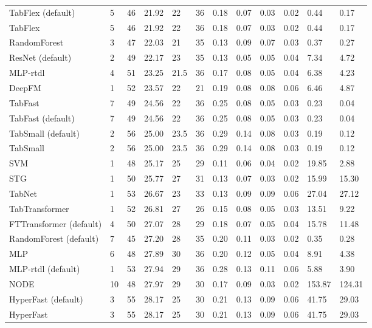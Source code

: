 \begin{tabular}{lllllrllllll}
TabFlex (default) & 5 & 46 & 21.92 & 22 & 36 & 0.18 & 0.07 & 0.03 & 0.02 & 0.44 & 0.17 \\
TabFlex & 5 & 46 & 21.92 & 22 & 36 & 0.18 & 0.07 & 0.03 & 0.02 & 0.44 & 0.17 \\
RandomForest & 3 & 47 & 22.03 & 21 & 35 & 0.13 & 0.09 & 0.07 & 0.03 & 0.37 & 0.27 \\
ResNet (default) & 2 & 49 & 22.17 & 23 & 35 & 0.13 & 0.05 & 0.05 & 0.04 & 7.34 & 4.72 \\
MLP-rtdl & 4 & 51 & 23.25 & 21.5 & 36 & 0.17 & 0.08 & 0.05 & 0.04 & 6.38 & 4.23 \\
DeepFM & 1 & 52 & 23.57 & 22 & 21 & 0.19 & 0.08 & 0.08 & 0.06 & 6.46 & 4.87 \\
TabFast & 7 & 49 & 24.56 & 22 & 36 & 0.25 & 0.08 & 0.05 & 0.03 & 0.23 & 0.04 \\
TabFast (default) & 7 & 49 & 24.56 & 22 & 36 & 0.25 & 0.08 & 0.05 & 0.03 & 0.23 & 0.04 \\
TabSmall (default) & 2 & 56 & 25.00 & 23.5 & 36 & 0.29 & 0.14 & 0.08 & 0.03 & 0.19 & 0.12 \\
TabSmall & 2 & 56 & 25.00 & 23.5 & 36 & 0.29 & 0.14 & 0.08 & 0.03 & 0.19 & 0.12 \\
SVM & 1 & 48 & 25.17 & 25 & 29 & 0.11 & 0.06 & 0.04 & 0.02 & 19.85 & 2.88 \\
STG & 1 & 50 & 25.77 & 27 & 31 & 0.13 & 0.07 & 0.03 & 0.02 & 15.99 & 15.30 \\
TabNet & 1 & 53 & 26.67 & 23 & 33 & 0.13 & 0.09 & 0.09 & 0.06 & 27.04 & 27.12 \\
TabTransformer & 1 & 52 & 26.81 & 27 & 26 & 0.15 & 0.08 & 0.05 & 0.03 & 13.51 & 9.22 \\
FTTransformer (default) & 4 & 50 & 27.07 & 28 & 29 & 0.18 & 0.07 & 0.05 & 0.04 & 15.78 & 11.48 \\
RandomForest (default) & 7 & 45 & 27.20 & 28 & 35 & 0.20 & 0.11 & 0.03 & 0.02 & 0.35 & 0.28 \\
MLP & 6 & 48 & 27.89 & 30 & 36 & 0.20 & 0.12 & 0.05 & 0.04 & 8.91 & 4.38 \\
MLP-rtdl (default) & 1 & 53 & 27.94 & 29 & 36 & 0.28 & 0.13 & 0.11 & 0.06 & 5.88 & 3.90 \\
NODE & 10 & 48 & 27.97 & 29 & 30 & 0.17 & 0.09 & 0.03 & 0.02 & 153.87 & 124.31 \\
HyperFast (default) & 3 & 55 & 28.17 & 25 & 30 & 0.21 & 0.13 & 0.09 & 0.06 & 41.75 & 29.03 \\
HyperFast & 3 & 55 & 28.17 & 25 & 30 & 0.21 & 0.13 & 0.09 & 0.06 & 41.75 & 29.03 \\

\end{tabular}
